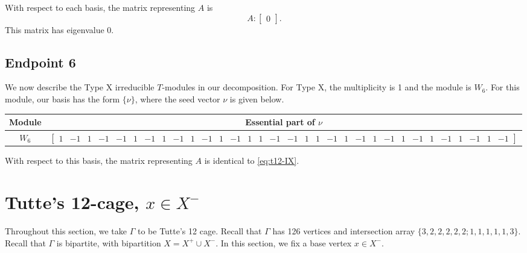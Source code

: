 \documentclass[12pt,letterpaper]{article}
\newcommand{\smallrowvector}[1]{\left[\begin{smallmatrix} #1 \end{smallmatrix}\right]}
\newcommand{\GraphNumber}{}
\newcommand{\GraphTitle}{}
\newcommand{\VertexCount}{}
\newcommand{\IntersectionArray}{}
\newcommand{\DateString}{}
\begin{document}
With respect to each basis, the matrix representing $A$ is
\begin{equation}
  A: \begin{bmatrix}
  0
\end{bmatrix}.
\label{eq:t12-IX}
\end{equation}
This matrix has eigenvalue $0$.

\subsection{Endpoint 6}

We now describe the Type X irreducible $T$-modules in our decomposition. For Type X, the multiplicity is 1 and the module is  $W_6$. For this module, our basis has the form $\{\nu\}$, where the seed vector $\nu$ is given below.
\begin{center}
    \begin{tabular}{c | c}
    \toprule
       \textbf{Module}  & \textbf {Essential part of }$\nu$ \\
       \midrule
       $W_{6}$  & $\smallrowvector{1 & -1 & 1 & -1 & -1 & 1 & -1 & 1 & -1 & 1 & -1 & 1 & -1 & 1 & 1 & -1 & -1 & 1 & 1 & -1 & 1 & -1 & 1 & -1 & 1 & -1 & 1 & -1 & 1 & -1 & 1 & -1}$ \\
    \bottomrule
    \end{tabular}
\end{center}

With respect to this basis, the matrix representing $A$ is identical to \eqref{eq:t12-IX}.


\renewcommand{\GraphNumber}{11b}
\renewcommand{\GraphTitle}{Tutte's 12-cage (Second Base Vertex)}
\renewcommand{\VertexCount}{126}
\renewcommand{\IntersectionArray}{\{3,2,2,2,2,2;1,1,1,1,1,3\}}
\renewcommand{\DateString}{2026.05.17}

\section{\texorpdfstring{Tutte's 12-cage, $x \in X^-$}{Tutte's 12-cage, x in X-}}\label{sec:12cage_b2}

Throughout this section, we take $\Gamma$ to be Tutte's 12 cage. Recall that
$\Gamma$ has 126 vertices and intersection array $\{3,2,2,2,2,2;1,1,1,1,1,3\}$. Recall that $\Gamma$ is bipartite,
with bipartition $X=X^+ \cup X^-$. In this section, we fix a base vertex $x \in X^-$. 
\end{document}
